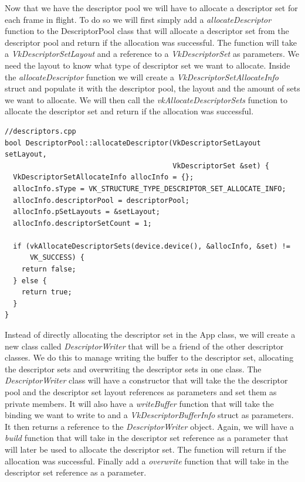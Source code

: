 \documentclass[12pt]{report} \usepackage{preamble}
\begin{document}
Now that we have the descriptor pool we will have to allocate a descriptor set for each frame in flight.
To do so we will first simply add a \textit{allocateDescriptor} function to the DescriptorPool class that will allocate a descriptor set from the descriptor pool
and return if the allocation was successful. The function will take a \textit{VkDescriptorSetLayout} and a reference to a \textit{VkDescriptorSet} as parameters.
We need the layout to know what type of descriptor set we want to allocate. Inside the \textit{allocateDescriptor} function we will create a \textit{VkDescriptorSetAllocateInfo} struct
and populate it with the descriptor pool, the layout and the amount of sets we want to allocate. We will then call the \textit{vkAllocateDescriptorSets} function to allocate the descriptor set
and return if the allocation was successful.

\begin{lstlisting}[Language=C++]
//descriptors.cpp
bool DescriptorPool::allocateDescriptor(VkDescriptorSetLayout setLayout,
                                        VkDescriptorSet &set) {
  VkDescriptorSetAllocateInfo allocInfo = {};
  allocInfo.sType = VK_STRUCTURE_TYPE_DESCRIPTOR_SET_ALLOCATE_INFO;
  allocInfo.descriptorPool = descriptorPool;
  allocInfo.pSetLayouts = &setLayout;
  allocInfo.descriptorSetCount = 1;

  if (vkAllocateDescriptorSets(device.device(), &allocInfo, &set) !=
      VK_SUCCESS) {
    return false;
  } else {
    return true;
  }
}
\end{lstlisting}

Instead of directly allocating the descriptor set in the App class, we will create a new class called \textit{DescriptorWriter} that will be a friend of the other descriptor classes.
We do this to manage writing the buffer to the descriptor set, allocating the descriptor sets and overwriting the descriptor sets in one class.
The \textit{DescriptorWriter} class will have a constructor that will take the the descriptor pool and the descriptor set layout references as parameters
and set them as private members. It will also have a \textit{writeBuffer} function that will take the binding we want to write to and a \textit{VkDescriptorBufferInfo} struct as parameters.
It then returns a reference to the \textit{DescriptorWriter} object. Again, we will have a \textit{build} function that will take in the descriptor set reference as a parameter
that will later be used to allocate the descriptor set. The function will return if the allocation was successful.
Finally add a \textit{overwrite} function that will take in the descriptor set reference as a parameter.
\end{document}
